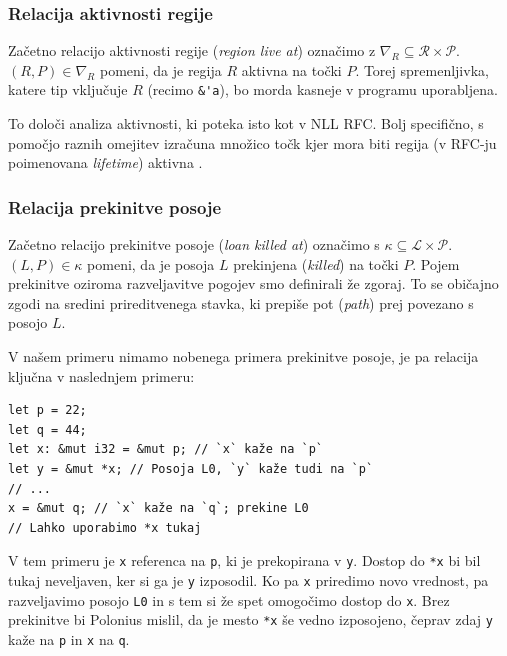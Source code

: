 \documentclass[a4paper,12pt,openright]{book}
\begin{document}
\subsubsection{Relacija aktivnosti regije}

Začetno relacijo aktivnosti regije (\textit{region live at}) označimo z $\nabla_{R} \subseteq \mathcal{R} \times \mathcal{P}$.
$(R, P) \in \nabla_{R}$ pomeni, da je regija $R$ aktivna na točki $P$. Torej spremenljivka, katere tip vključuje $R$ (recimo \verb|&'a|),
bo morda kasneje v programu uporabljena.

To določi analiza aktivnosti, ki poteka isto kot v NLL RFC. Bolj specifično, s pomočjo raznih omejitev izračuna množico točk
kjer mora biti regija (v RFC-ju poimenovana \textit{lifetime}) aktivna \cite{2094nllRustRFC}.

\subsubsection{Relacija prekinitve posoje}

Začetno relacijo prekinitve posoje (\textit{loan killed at}) označimo s $\kappa \subseteq \mathcal{L} \times \mathcal{P}$.
$(L,P) \in \kappa$ pomeni, da je posoja $L$ prekinjena (\textit{killed}) na točki $P$. Pojem prekinitve oziroma razveljavitve
pogojev smo definirali že zgoraj. To se običajno zgodi na sredini prireditvenega stavka, ki prepiše pot (\textit{path}) prej povezano s posojo $L$.

V našem primeru nimamo nobenega primera prekinitve posoje, je pa relacija ključna v naslednjem primeru:

\begin{listing}[!ht]
	\begin{verbatim}
let p = 22;
let q = 44;
let x: &mut i32 = &mut p; // `x` kaže na `p`
let y = &mut *x; // Posoja L0, `y` kaže tudi na `p`
// ...
x = &mut q; // `x` kaže na `q`; prekine L0
// Lahko uporabimo *x tukaj
\end{verbatim}
	\caption{Primer prekinitve posoje}
	\label{listing:loanKilled}
\end{listing}

V tem primeru je \verb|x| referenca na \verb|p|, ki je prekopirana v \verb|y|. Dostop do \verb|*x| bi bil tukaj neveljaven,
ker si ga je \verb|y| izposodil. Ko pa \verb|x| priredimo novo vrednost, pa razveljavimo posojo \verb|L0| in s tem si že spet
omogočimo dostop do \verb|x|. Brez prekinitve bi Polonius mislil, da je mesto \verb|*x| še vedno izposojeno, čeprav
zdaj \verb|y| kaže na \verb|p| in \verb|x| na \verb|q|.
\end{document}
